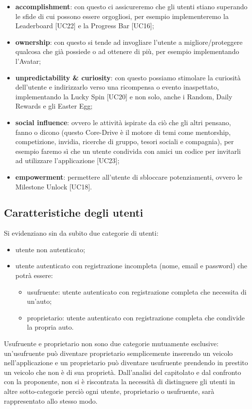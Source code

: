 \begin{itemize}
	\item \textbf{accomplishment}: con questo ci assicureremo che gli utenti stiano superando le sfide di cui possono essere orgogliosi, per esempio implementeremo la Leaderboard [UC22] e la Progress Bar [UC16];
	\item \textbf{ownership}: con questo si tende ad invogliare l'utente a migliore/proteggere qualcosa che già possiede o ad ottenere di più, per esempio implementando l'Avatar;
	\item \textbf{unpredictability \& curiosity}: con questo possiamo stimolare la curiosità dell'utente e indirizzarlo verso una ricompensa o evento inaspettato, implementando la Lucky Spin [UC20] e non solo, anche i Random, Daily Rewards e gli Easter Egg;
	\item \textbf{social influence}: ovvero le attività ispirate da ciò che gli altri pensano, fanno o dicono (questo Core-Drive è il motore di temi come mentorship, competizione, invidia, ricerche di gruppo, tesori sociali e compagnia), per esempio faremo sì che un utente condivida con amici un codice per invitarli ad utilizzare l’applicazione [UC23];
	\item \textbf{empowerment}: permettere all'utente di sbloccare potenziamenti, ovvero le Milestone Unlock [UC18].
\end{itemize}
\subsection{Caratteristiche degli utenti}
Si evidenziano sin da subito due categorie di utenti:
\begin{itemize}
	\item utente non autenticato;
	\item utente autenticato con registrazione incompleta (nome, email e password) che potrà essere:
		\begin{itemize}
			\item usufruente: utente autenticato con registrazione completa che necessita di un'auto;
			\item proprietario: utente autenticato con registrazione completa che condivide la propria auto.
		\end{itemize}		
\end{itemize}
Usufruente e proprietario non sono due categorie mutuamente esclusive: un'usufruente può diventare proprietario semplicemente inserendo un veicolo nell'applicazione e un proprietario può diventare usufruente prendendo in prestito un veicolo che non è di sua proprietà.
\newline
Dall'analisi del capitolato e dal confronto con la proponente, non si è riscontrata la necessità di distinguere gli utenti in altre sotto-categorie perciò ogni utente, proprietario o usufruente, sarà rappresentato allo stesso modo.